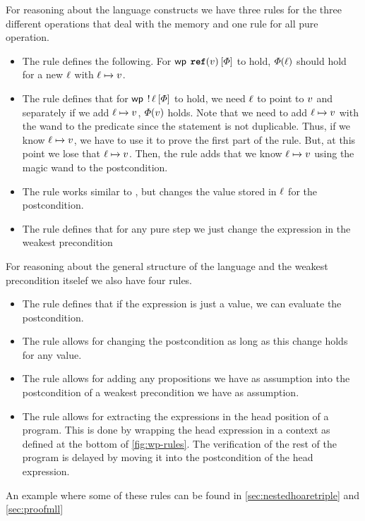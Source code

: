 \documentclass[thesis.tex]{subfiles}
\begin{document}
For reasoning about the language constructs we have three rules for the three different operations that deal with the memory and one rule for all pure operation.
\begin{itemize}
  \item The rule  defines the following. For $\wpre{\Alloc(\val)}{\pred}$ to hold, $\varPhi(\ell)$ should hold for a new $\ell$ with $\loc\fmapsto\val$.
  \item The rule  defines that for $\wpre{\deref \loc}{\pred}$ to hold, we need $\ell$ to point to $v$ and separately if we add $\loc\fmapsto\val$, $\varPhi(v)$ holds. Note that we need to add $\loc\fmapsto\val$ with the wand to the predicate since the statement is not duplicable. Thus, if we know $\loc\fmapsto\val$, we have to use it to prove the first part of the  rule. But, at this point we lose that $\loc\fmapsto\val$. Then, the  rule adds that we know $\loc\fmapsto\val$ using the magic wand to the postcondition.
  \item The rule  works similar to , but changes the value stored in $\ell$ for the postcondition.
  \item The rule  defines that for any pure step we just change the expression in the weakest precondition
\end{itemize}
For reasoning about the general structure of the language and the weakest precondition itselef we also have four rules.
\begin{itemize}
  \item The rule  defines that if the expression is just a value, we can evaluate the postcondition.
  \item The rule  allows for changing the postcondition as long as this change holds for any value.
  \item The rule  allows for adding any propositions we have as assumption into the postcondition of a weakest precondition we have as assumption.
  \item The rule  allows for extracting the expressions in the head position of a program. This is done by wrapping the head expression in a context as defined at the bottom of \cref*{fig:wp-rules}. The verification of the rest of the program is delayed by moving it into the postcondition of the head expression.
\end{itemize}
An example where some of these rules can be found in \cref*{sec:nestedhoaretriple} and \cref*{sec:proofmll}
\end{document}
